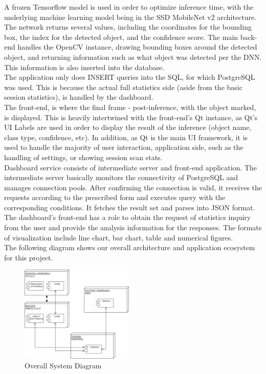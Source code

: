 \documentclass[conference]{IEEEtran}
\begin{document}
A frozen Tensorflow model is used in order to optimize inference time, with the underlying machine learning model being in the SSD MobileNet v2 architecture. The network returns several values, including the coordinates for the bounding box, the index for the detected object, and the confidence score. The main back-end handles the OpenCV instance, drawing bounding boxes around the detected object, and returning information such as what object was detected per the DNN. This information is also inserted into the database.\\

The application only does INSERT queries into the SQL, for which PostgreSQL was used. This is because the actual full statistics side (aside from the basic session statistics), is handled by the dashboard.\\

The front-end, is where the final frame - post-inference, with the object marked, is displayed. This is heavily intertwined with the front-end's Qt instance, as Qt's UI Labels are used in order to display the result of the inference (object name, class type, confidence, etc). In addition, as Qt is the main UI framework, it is used to handle the majority of user interaction, application side, such as the handling of settings, or showing session scan stats.\\

Dashboard service consists of intermediate server and front-end application. The intermediate server basically monitors the connectivity of PostgreSQL and manages connection pools. After confirming the connection is valid, it receives the  requests according to the prescribed form and executes query with the corresponding conditions. It fetches the result set and parses into JSON format.\\

The dashboard's front-end has a role to obtain the request of statistics inquiry from the user and provide the analysis information for the responses. The formats of visualization include line chart, bar chart, table and numerical figures.\\

The following diagram shows our overall architecture and application ecosystem for this project.\\

\begin{figure}[h]
    \centering
    \includegraphics[width=0.48\textwidth]{images/app_diagram.eps}
    \caption{Overall System Diagram}
\end{figure}~\\
\end{document}
